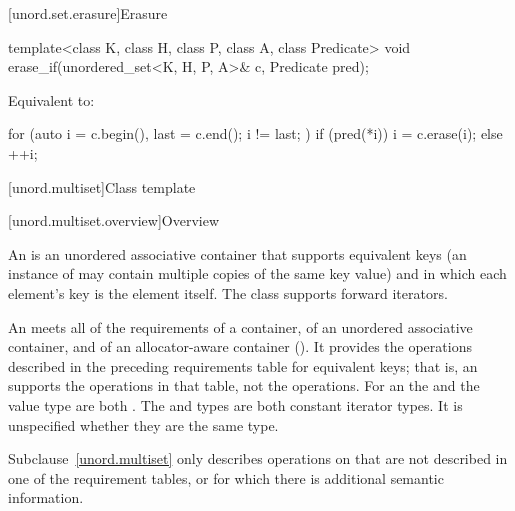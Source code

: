 [unord.set.erasure]{Erasure}

%
\begin{itemdecl}
template<class K, class H, class P, class A, class Predicate>
  void erase_if(unordered_set<K, H, P, A>& c, Predicate pred);
\end{itemdecl}

\begin{itemdescr}
\pnum
\effects
Equivalent to:
\begin{codeblock}
for (auto i = c.begin(), last = c.end(); i != last; ) {
  if (pred(*i)) {
    i = c.erase(i);
  } else {
    ++i;
  }
}
\end{codeblock}
\end{itemdescr}

[unord.multiset]{Class template }%

[unord.multiset.overview]{Overview}

\pnum
{}%
%
An  is an unordered associative container
that supports equivalent keys (an instance of  may contain
multiple copies of the same key value) and in which each element's key
is the element itself.
The  class
supports forward iterators.

\pnum
An  meets all of the requirements of a container, of an
unordered associative container, and of an allocator-aware container
(). It provides the operations described in the
preceding requirements table for equivalent keys; that is, an 
supports the  operations in that table, not the  operations.
For an  the  and the value type are
both . The  and  types are both
constant iterator types. It is unspecified whether they are the same type.

\pnum
Subclause~\ref{unord.multiset} only describes operations on  that
are not described in one of the requirement tables, or for which there
is additional semantic information.


